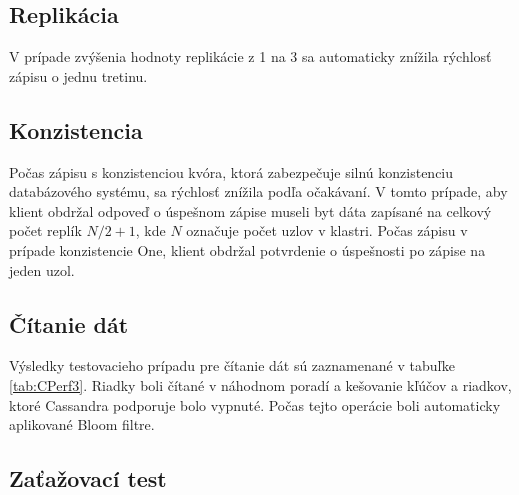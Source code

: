 \documentclass[11pt,twoside,a4paper]{book}
\begin{document}
\subsection*{Replikácia}

V prípade zvýšenia hodnoty replikácie z 1 na 3 sa automaticky znížila rýchlosť zápisu o jednu tretinu.

\subsection*{Konzistencia}

Počas zápisu s konzistenciou kvóra, ktorá zabezpečuje silnú konzistenciu databázového systému, sa rýchlosť znížila podľa očakávaní. V tomto prípade, aby klient obdržal odpoveď o úspešnom zápise museli byt dáta zapísané na celkový počet replík $N/2 + 1$, kde $N$ označuje počet uzlov v klastri. Počas zápisu v prípade konzistencie One, klient obdržal potvrdenie o úspešnosti po zápise na jeden uzol.

\subsection*{Čítanie dát}

Výsledky testovacieho prípadu pre čítanie dát sú zaznamenané v tabuľke \ref{tab:CPerf3}. Riadky boli čítané v náhodnom poradí a kešovanie kľúčov a riadkov, ktoré Cassandra podporuje bolo vypnuté. Počas tejto operácie boli automaticky aplikované Bloom filtre.



\subsection*{Zaťažovací test}
\end{document}
